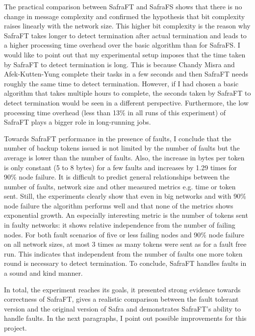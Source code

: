 The practical comparison between SafraFT and SafraFS shows that there is no change in message complexity and confirmed the hypothesis that bit complexity raises linearly with the network size.
This higher bit complexity is the reason why SafraFT takes longer to detect termination after actual termination and leads to a higher processing time overhead over the basic algorithm than for SafraFS.
I would like to point out that my experimental setup imposes that the time taken by SafraFT to detect termination is long.
This is because Chandy Misra and Afek-Kutten-Yung complete their tasks in a few seconds and then SafraFT needs roughly the same time to detect termination.
However, if I had chosen a basic algorithm that takes multiple hours to complete, the seconds taken by SafraFT to detect termination would be seen in a different perspective.
Furthermore, the low processing time overhead (less than 13\% in all runs of this experiment)  %
of SafraFT plays a bigger role in long-running jobs.

Towards SafraFT performance in the presence of faults, I conclude that the number of backup tokens issued is not limited by the number of faults but the average is lower than the number of faults.
Also, the increase in bytes per token is only constant (5 to 8 bytes) for a few faults and increases by 1.29 times for 90\% node failure.  %
It is difficult to predict general relationships between the number of faults, network size and other measured metrics e.g. time or token sent.
Still, the experiments clearly show that even in big networks and with 90\% node failure the algorithm performs well and that none of the metrics shows exponential growth.
An especially interesting metric is the number of tokens sent in faulty networks: it shows relative independence from the number of failing nodes.
For both fault scenarios of five or less failing nodes and 90\% node failure on all network sizes, at most 3 times as many tokens were sent as for a fault free run. %
This indicates that independent from the number of faults one more token round is necessary to detect termination.
To conclude, SafraFT handles faults in a sound and kind manner.

In total, the experiment reaches its goals, it presented strong evidence towards correctness of SafraFT, gives a realistic comparison between the fault tolerant version and the original version of Safra and demonstrates SafraFT's ability to handle faults.
In the next paragraphs, I point out possible improvements for this project.

